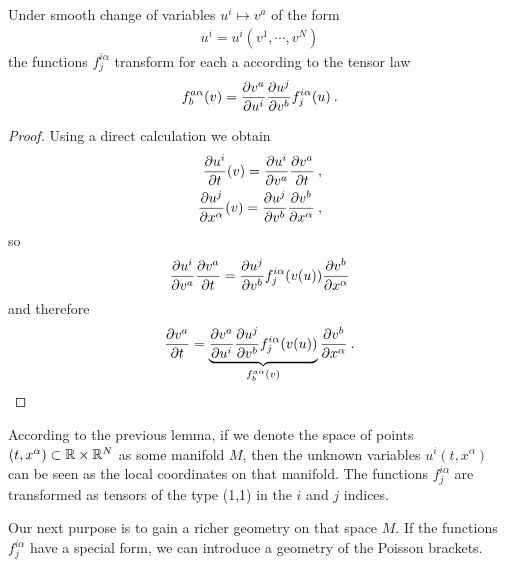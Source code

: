 \begin{proposition} 
    \label{prop:transformace-A} 
    Under smooth change of variables $u^i \mapsto v^a$ of the form
    \begin{align}
        u^i = u^i(v^1,\cdots, v^N)
    \end{align}
    the functions $f^{i\alpha}_{j}$ transform for each a according to the tensor law
    \begin{align}
        f^{a \alpha}_{b}(v) = \frac{\partial v^a}{\partial u^i} \frac{\partial u^j}{\partial v^b} f^{i \alpha}_j (u) \:.
    \end{align}
\end{proposition}
\begin{proof}
    Using a direct calculation we obtain
    \begin{align}
        \frac{\partial u^i}{\partial t}(v) = \frac{\partial u^i}{\partial v^a} \frac{\partial v^a}{\partial t} \:, \\
        \frac{\partial u^j}{\partial x^\alpha}(v) = \frac{\partial u^j}{\partial v^b} \frac{\partial v^b}{\partial x^\alpha}\:,
    \end{align}
    so
    \begin{align}
        \frac{\partial u^i}{\partial v^a} \frac{\partial v^a}{\partial t} = \frac{\partial u^j}{\partial v^b} f^{i \alpha}_j (v(u)) \frac{\partial v^b}{\partial x^\alpha}
    \end{align}
    and therefore
    \begin{align}
        \frac{\partial v^a}{\partial t} = \underbrace{\frac{\partial v^a}{\partial u^i} \frac{\partial u^j}{\partial v^b} f^{i \alpha}_j(v(u))}_{f^{a \alpha}_b(v)} \frac{\partial v^b}{\partial x^\alpha} \:.
    \end{align}
\end{proof}

According to the previous lemma, if we denote the space of points $(t,x^\alpha) \subset \mathbb{R} \times \mathbb{R}^N$ as some manifold $M$, then the unknown variables $u^i(t,x^\alpha)$ can be seen as the local coordinates on that manifold. The functions $f^{i \alpha}_j$ are transformed as tensors of the type (1,1) in the $i$ and $j$ indices.

Our next purpose is to gain a richer geometry on that space $M$. If the functions $f^{i \alpha}_j$ have a special form, we can introduce a geometry of the Poisson brackets.

